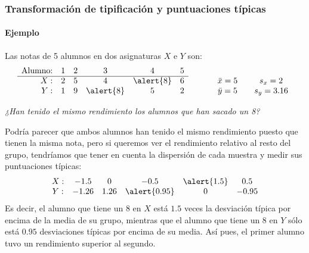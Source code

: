 \begin{frame}
\frametitle{Transformación de tipificación y puntuaciones típicas}
\framesubtitle{Ejemplo}
Las notas de 5 alumnos en dos asignaturas $X$ e $Y$ son:
\[
\begin{array}{rccccccccc}
\mbox{Alumno:} & 1 & 2 & 3 & 4 & 5\\ \cline{1-6}
X: & 2 & 5 & 4 & \alert{8} & 6 & \qquad & \bar x = 5 & \quad s_x = 2\\
Y: & 1 & 9 & \alert{8} & 5 & 2 & \qquad & \bar y = 5 & \quad s_y = 3.16\\
\end{array}
\]
\begin{center}
\emph{¿Han tenido el mismo rendimiento los alumnos que han sacado un 8?}
\end{center}
Podría parecer que ambos alumnos han tenido el mismo rendimiento puesto que tienen la misma nota, pero si queremos ver el rendimiento relativo al resto del grupo, tendríamos que tener en cuenta la dispersión de cada muestra y medir sus puntuaciones típicas:
\[
\begin{array}{cccccc}
X: & -1.5 & 0 & -0.5 & \alert{1.5} & 0.5 \\
Y: & -1.26 & 1.26 & \alert{0.95} & 0 & -0.95\\
\end{array}
\]
Es decir, el alumno que tiene un 8 en $X$ está $1.5$ veces la desviación típica por encima de la media de su grupo, mientras que el alumno que tiene un 8 en $Y$ sólo está $0.95$ desviaciones típicas por encima de su media.
Así pues, el primer alumno tuvo un rendimiento superior al segundo. 

\end{frame}
